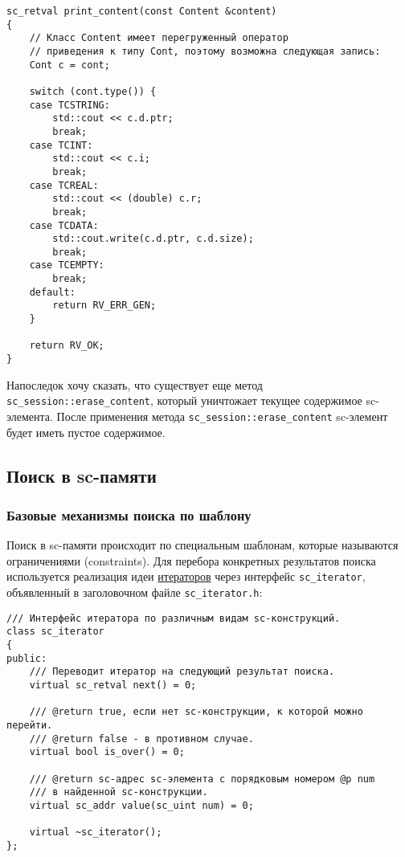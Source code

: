 \begin{lstlisting}[texcl]
sc_retval print_content(const Content &content)
{
    // Класс Content имеет перегруженный оператор
    // приведения к типу Cont, поэтому возможна следующая запись:
    Cont c = cont;

    switch (cont.type()) {
    case TCSTRING:
        std::cout << c.d.ptr;
        break;
    case TCINT:
        std::cout << c.i;
        break;
    case TCREAL:
        std::cout << (double) c.r;
        break;
    case TCDATA:
        std::cout.write(c.d.ptr, c.d.size);
        break;
    case TCEMPTY:
        break;
    default:
        return RV_ERR_GEN;
    }

    return RV_OK;
}
\end{lstlisting}

Напоследок хочу сказать, что существует еще метод
\lstinline|sc_session::erase_content|, который уничтожает текущее
содержимое sc-элемента. После применения метода
\lstinline|sc_session::erase_content| sc-элемент будет иметь пустое
содержимое.

\subsection{Поиск в sc-памяти}
\label{sec:libsc_search}

\subsubsection{Базовые механизмы поиска по шаблону}
\label{sec:libsc_search_basic}

Поиск в sc-памяти происходит по специальным шаблонам, которые
называются ограничениями (constraints). Для перебора конкретных
результатов поиска используется реализация идеи
\href{http://ru.wikipedia.org/wiki/%D0%98%D1%82%D0%B5%D1%80%D0%B0%D1%82%D0%BE%D1%80}{итераторов}
через
интерфейс \lstinline|sc_iterator|, объявленный в заголовочном файле
\verb|sc_iterator.h|:

\begin{lstlisting}[texcl]
/// Интерфейс итератора по различным видам sc-конструкций.
class sc_iterator
{
public:
    /// Переводит итератор на следующий результат поиска.
    virtual sc_retval next() = 0;

    /// @return true, если нет sc-конструкции, к которой можно перейти.
    /// @return false - в противном случае.
    virtual bool is_over() = 0;

    /// @return sc-адрес sc-элемента с порядковым номером @p num
    /// в найденной sc-конструкции.
    virtual sc_addr value(sc_uint num) = 0;

    virtual ~sc_iterator();
};
\end{lstlisting}

